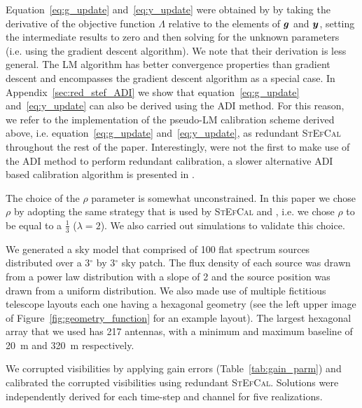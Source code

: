 \documentclass[useAMS,usenatbib]{mn2e}
\newcommand{\bg}{\bmath{g}}
\newcommand{\by}{\bmath{y}}
\begin{document}
Equation~\ref{eq:g_update} and~\ref{eq:y_update} were obtained by \citet{Marthi2014} by taking the derivative of the objective function $\Lambda$ relative to the elements of $\bg$ and $\by$, setting the intermediate results to zero and then solving for the unknown parameters (i.e. using the gradient descent algorithm). 
We note that their derivation is less general. The LM algorithm has better convergence properties than gradient descent and 
encompasses the gradient descent algorithm as a special case. In Appendix~\ref{sec:red_stef_ADI} we show that equation~\ref{eq:g_update} and~\ref{eq:y_update} can also be derived using the ADI method.
For this reason, we refer to the implementation of the pseudo-LM calibration scheme derived above, i.e. equation~\ref{eq:g_update} and~\ref{eq:y_update}, as redundant \textsc{StEfCal} throughout the rest of the paper.
Interestingly, \citet{Marthi2014} were not the first to make use of the ADI method to perform redundant calibration, a slower alternative ADI based calibration algorithm is presented in \citet{Wijnholds2012}.

The choice of the $\rho$ parameter is somewhat unconstrained. In this paper we chose $\rho$ by adopting the same strategy that is used by \textsc{StEfCal} and \citet{Marthi2014},
i.e. we chose $\rho$ to be equal to a $\frac{1}{3}$ ($\lambda = 2$). We also carried out simulations to validate this choice.

We generated a sky model that comprised of 100 flat spectrum sources distributed over a 3$^{\circ}$ by 3$^{\circ}$ sky 
patch. The flux density of each source was drawn from a power law distribution with a slope of 2 and the source position was drawn from a uniform distribution. 
We also made use of multiple fictitious telescope layouts each one having a hexagonal geometry (see the left upper image of Figure~\ref{fig:geometry_function} for an example layout). The largest hexagonal array that we used has 217 antennas, with a minimum and maximum baseline of 20~m and 320~m respectively.

We corrupted visibilities by applying gain errors (Table~\ref{tab:gain_parm}) and calibrated the corrupted visibilities using redundant \textsc{StEfCal}. Solutions were independently derived for each time-step and channel for five realizations. 
\end{document}
